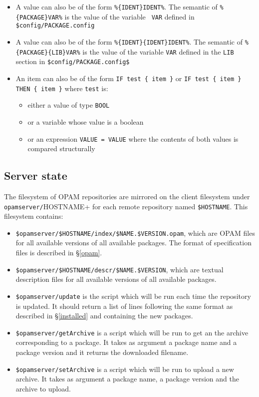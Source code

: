 \documentclass[a4paper,11pt]{article}
\begin{document}
\begin{itemize}
\item A value can also be of the form \verb+%{IDENT}IDENT%+. The
 semantic of \verb+%{PACKAGE}VAR%+ is the value of the variable {\tt
 VAR} defined in \verb+$config/PACKAGE.config+
\item A value can also be of the form
  \verb+%{IDENT}{IDENT}IDENT%+. The semantic of
  \verb+%{PACKAGE}{LIB}VAR%+ is the value of the variable {\tt VAR}
  defined in the {\tt LIB} section in \verb+$config/PACKAGE.config$+
\item An item can also be of the form \verb+IF test { item }+ or
  \verb+IF test { item } THEN { item }+
  where {\tt test} is:
\begin{itemize}
\item either a value of type {\tt BOOL}
\item or a variable whose value is a boolean
\item or an expression {\tt VALUE = VALUE} where the contents of both
  values is compared structurally
\end{itemize}
\end{itemize}

\subsection{Server state}

The filesystem of OPAM repositories are mirrored on the client
filesystem under \verb$opamserver/$HOSTNAME+ for each remote
repository named \verb+$HOSTNAME+. This filesystem contains:

\begin{itemize}

\item \verb+$opamserver/$HOSTNAME/index/$NAME.$VERSION.opam+, which are
  OPAM files for all available versions of all available packages. The
  format of specification files is described in \S\ref{opam}.

\item \verb+$opamserver/$HOSTNAME/descr/$NAME.$VERSION+, which are
  textual description files for all available versions of all
  available packages.

\item \verb+$opamserver/update+ is the script which will be run each
  time the repository is updated. It should return a list of lines
  following the same format as described in \S\ref{installed} and
  containing the new packages.

\item \verb+$opamserver/getArchive+ is a script which will be run to
  get an the archive corresponding to a package. It takes as argument
  a package name and a package version and it returns the downloaded
  filename.

\item \verb+$opamserver/setArchive+ is a script which will be run
  to upload a new archive. It takes as argument a package name, a
  package version and the archive to upload.

\end{itemize}
\end{document}
